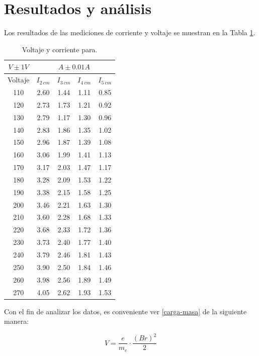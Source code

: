 \documentclass[prb,aps,twocolumn,preprintnumbers,amsmath,amssymb]{revtex4}
\begin{document}
\section{Resultados y análisis}

Los resultados de las mediciones de corriente y voltaje se muestran en la Tabla \ref{Tabla 1}.\\

\begin{table}[h!]
	\caption{\label{Tabla 1}Voltaje y corriente para.}
	\begin{ruledtabular}
		\begin{tabular}{ccccc}
			\multicolumn{1}{c}{$V \pm 1V$} & \multicolumn{4}{c}{$A \pm 0.01A$ } \\
			\hline
			Voltaje &$I_{2\ cm}$&$I_{3\ cm}$&$I_{4\ cm}$&$I_{5\ cm}$\\
			\hline
			110 & 2.60 & 1.44 & 1.11 & 0.85 \\
			120 & 2.73 & 1.73 & 1.21 & 0.92\\
			130 & 2.79 & 1.17 & 1.30 & 0.96\\
			140 & 2.83 & 1.86 & 1.35 & 1.02\\
			150 & 2.96 & 1.87 & 1.39 & 1.08\\
			160 & 3.06 & 1.99 & 1.41 & 1.13\\
			170 & 3.17 & 2.03 & 1.47 & 1.17\\
			180 & 3.28 & 2.09 & 1.53 & 1.22\\
			190 & 3.38 & 2.15 & 1.58 & 1.25\\
			200 & 3.46 & 2.21 & 1.63 & 1.30\\
			210 & 3.60 & 2.28 & 1.68 & 1.33\\
			220 & 3.68 & 2.33 & 1.72 & 1.36\\
			230 & 3.73 & 2.40 & 1.77 & 1.40\\
			240 & 3.79 & 2.46 & 1.81 & 1.43\\
			250 & 3.90 & 2.50 & 1.84 & 1.46\\
			260 & 3.98 & 2.56 & 1.89 & 1.49\\
			270 & 4.05 & 2.62 & 1.93 & 1.53\\
		\end{tabular}
	\end{ruledtabular}
\end{table}

Con el fin de analizar los datos, es conveniente ver \eqref{carga-masa} de la siguiente manera:

\begin{equation}
V = \frac{e}{m_{e}}\cdot\frac{(Br)^2}{2} 
\label{lineal}
\end{equation}
\end{document}
